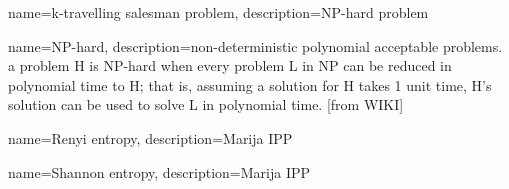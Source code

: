 {
        name=k-travelling salesman problem,
        description={NP-hard problem}
}

{
        name=NP-hard,
        description={non-deterministic polynomial acceptable problems.  a problem H is NP-hard when every problem L in NP can be reduced in polynomial time to H; that is, assuming a solution for H takes 1 unit time, H‎'s solution can be used to solve L in polynomial time. [from WIKI]}
}

{
        name=Renyi entropy,
        description={Marija IPP}
}

{
        name=Shannon entropy,
        description={Marija IPP}
}
